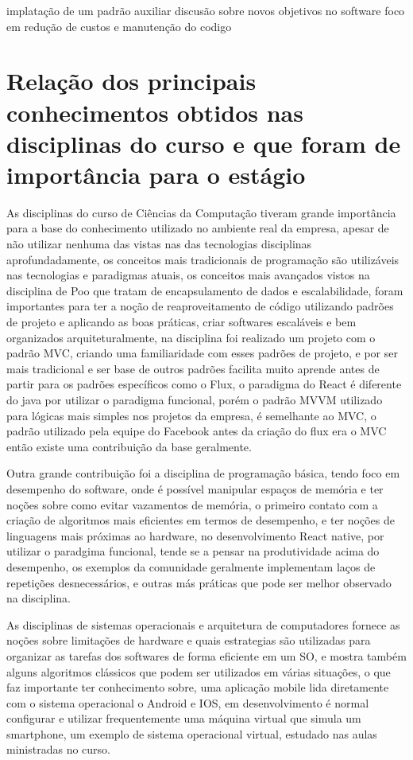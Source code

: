 \documentclass{ufersa}
\begin{document}
implatação de um padrão auxiliar
discusão sobre novos objetivos no software
foco em redução de custos e manutenção do codigo

\section{Relação dos principais conhecimentos obtidos nas disciplinas do curso e que foram de importância para o estágio}
As disciplinas do curso de Ciências da Computação tiveram grande importância para a base do conhecimento utilizado no ambiente real da empresa, apesar de não utilizar nenhuma das vistas nas das tecnologias disciplinas aprofundadamente, os conceitos mais tradicionais de programação são utilizáveis nas tecnologias e paradigmas atuais,  os conceitos mais avançados vistos na disciplina de Poo que tratam de encapsulamento de dados e escalabilidade, foram importantes para ter a noção de reaproveitamento de código utilizando padrões de projeto e aplicando as boas práticas,  criar softwares escaláveis e bem organizados arquiteturalmente, na disciplina foi realizado um projeto com o padrão MVC, criando  uma familiaridade com esses padrões de projeto, e por ser mais tradicional e ser base de outros padrões facilita muito aprende antes de partir para os padrões específicos como o Flux, o paradigma do React é diferente do java por utilizar o paradigma funcional, porém o padrão MVVM utilizado para lógicas mais simples nos projetos da empresa, é semelhante ao MVC, o padrão utilizado pela equipe do Facebook antes da criação do flux era o MVC então existe uma contribuição da base geralmente. 

Outra grande contribuição foi a disciplina de programação básica, tendo foco em desempenho do software, onde é possível manipular espaços de memória e ter noções sobre como evitar vazamentos de memória, o primeiro contato com a criação de algoritmos mais eficientes em termos de desempenho, e ter noções de linguagens mais próximas ao hardware, no desenvolvimento React native, por utilizar o paradgima funcional, tende se a pensar na produtividade acima do desempenho, os exemplos da comunidade geralmente implementam laços de repetições desnecessários, e outras más práticas que pode ser melhor observado na disciplina.

As disciplinas de sistemas operacionais e arquitetura de computadores fornece as noções sobre limitações de hardware e quais estrategias são utilizadas para organizar as tarefas dos softwares de forma eficiente em um SO, e mostra também alguns algoritmos clássicos que podem ser utilizados em várias situações, o que faz importante ter conhecimento sobre, uma aplicação mobile lida diretamente com o sistema operacional o Android e IOS, em desenvolvimento é normal configurar e utilizar frequentemente uma máquina virtual que simula um smartphone, um exemplo de sistema operacional virtual, estudado nas aulas ministradas no curso.  
\end{document}
